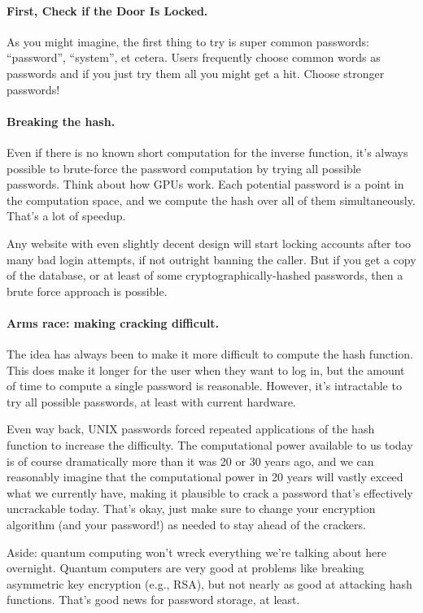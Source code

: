 \paragraph{First, Check if the Door Is Locked.}
As you might imagine, the first thing to try is super common passwords: ``password'', ``system'', et cetera. Users frequently choose common words as passwords and if you just try them all you might get a hit. Choose stronger passwords!

\paragraph{Breaking the hash.} Even if there is no known short computation for the
inverse function, it's always possible to brute-force the password
computation by trying all possible passwords. Think about how GPUs
work. Each potential password is a point in the computation space, and
we compute the hash over all of them simultaneously. That's a lot of
speedup.

Any website with even slightly decent design will start locking accounts after too many bad login attempts, if not outright banning the caller. But if you get a copy of the database, or at least of some cryptographically-hashed passwords, then a brute force approach is possible.

\paragraph{Arms race: making cracking difficult.} The idea has always been
to make it more difficult to compute the hash function. This does make it longer for the user when they want to log in, but the amount of time to compute a single password is reasonable. However, it's intractable to try all possible passwords, at least with current hardware. 

Even way back,
UNIX passwords forced repeated applications of the hash function to increase the difficulty. The computational power available to us today is of course dramatically more than it was 20 or 30 years ago, and we can reasonably imagine that the computational power in 20 years will vastly exceed what we currently have, making it plausible to crack a password that's effectively uncrackable today. That's okay, just make sure to change your encryption algorithm (and your password!) as needed to stay ahead of the crackers.

Aside: quantum computing won't wreck everything we're talking about here overnight. Quantum computers are very good at problems like breaking asymmetric key encryption (e.g., RSA), but not nearly as good at attacking hash functions. That's good news for password storage, at least.

